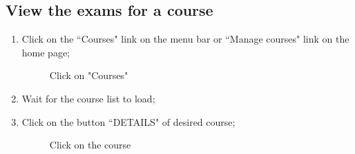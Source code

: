 \documentclass[ManualeUtente]{subfiles}
\begin{document}
	\subsection{View the exams for a course}
	\begin{enumerate}
		\item Click on the \textquotedblleft Courses" link on the menu bar or \textquotedblleft Manage courses" link on the home page;
		\begin{figure}[H]
			\centering
			\caption{Click on "Courses"}
			\label{fig:Click on "Courses"}
		\end{figure}
		\item Wait for the course list to load;
		\item Click on the button \textquotedblleft DETAILS" of desired course;
		\begin{figure}[H]
			\centering
			\caption{Click on the course}
			\label{fig:Click on the course}
		\end{figure}

\end{enumerate}
\end{document}
